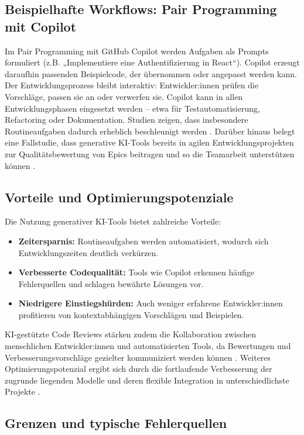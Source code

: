 \subsection{Beispielhafte Workflows: Pair Programming mit Copilot}

Im Pair Programming mit GitHub Copilot werden Aufgaben als Prompts formuliert
(z.B. „Implementiere eine Authentifizierung in React“). Copilot erzeugt
daraufhin passenden Beispielcode, der übernommen oder angepasst werden kann.
Der Entwicklungsprozess bleibt interaktiv: Entwickler:innen prüfen die
Vorschläge, passen sie an oder verwerfen sie. Copilot kann in allen
Entwicklungsphasen eingesetzt werden – etwa für Testautomatisierung,
Refactoring oder Dokumentation. Studien zeigen, dass insbesondere
Routineaufgaben dadurch erheblich beschleunigt werden
\cite{kerr_github_nodate,weisz_design_2024,shi_ai-assisted_2023}. Darüber
hinaus belegt eine Fallstudie, dass generative KI-Tools bereits in agilen
Entwicklungsprojekten zur Qualitätsbewertung von Epics beitragen und so die
Teamarbeit unterstützen können \cite{geyer_case_2025}.

\subsection{Vorteile und Optimierungspotenziale}

Die Nutzung generativer KI-Tools bietet zahlreiche Vorteile:
\begin{itemize}
    \item \textbf{Zeitersparnis:} Routineaufgaben werden automatisiert, wodurch sich Entwicklungszeiten deutlich verkürzen.
    \item \textbf{Verbesserte Codequalität:} Tools wie Copilot erkennen häufige Fehlerquellen und schlagen bewährte Lösungen vor.
    \item \textbf{Niedrigere Einstiegshürden:} Auch weniger erfahrene Entwickler:innen profitieren von kontextabhängigen Vorschlägen und Beispielen.
\end{itemize}
KI-gestützte Code Reviews stärken zudem die Kollaboration zwischen menschlichen Entwickler:innen und automatisierten Tools, da Bewertungen und Verbesserungsvorschläge gezielter kommuniziert werden können \cite{alami_human_2025}. Weiteres Optimierungspotenzial ergibt sich durch die fortlaufende Verbesserung der zugrunde liegenden Modelle und deren flexible Integration in unterschiedlichste Projekte \cite{kerr_github_nodate,weisz_design_2024}.

\subsection{Grenzen und typische Fehlerquellen}

